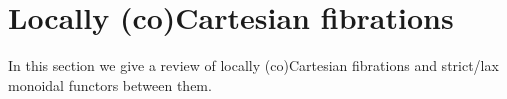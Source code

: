 \section{Locally (co)Cartesian fibrations}
In this section we give a review of locally (co)Cartesian fibrations and strict/lax monoidal functors between them.

